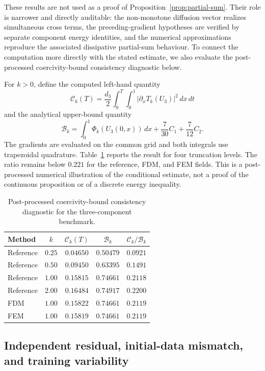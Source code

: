 These results are not used as a proof of Proposition~\ref{prop:partial-sum}. Their role is narrower and directly auditable: the non-monotone diffusion vector realizes simultaneous cross terms, the preceding-gradient hypotheses are verified by separate component energy identities, and the numerical approximations reproduce the associated dissipative partial-sum behaviour. To connect the computation more directly with the stated estimate, we also evaluate the post-processed coercivity-bound consistency diagnostic below.

For $k>0$, define the computed left-hand quantity
\[
 \mathcal C_k(T)=\frac{d_3}{2}\int_0^T\!\!\int_0^1 |\partial_xT_k(U_3)|^2\,dx\,dt
\]
and the analytical upper-bound quantity
\[
 \mathcal B_k=\int_0^1\Phi_k(U_3(0,x))\,dx+\frac7{30}C_1+\frac7{12}C_2.
\]
The gradients are evaluated on the common grid and both integrals use trapezoidal quadrature. Table~\ref{tab:coercivity-diagnostic} reports the result for four truncation levels. The ratio remains below $0.221$ for the reference, FDM, and FEM fields. This is a post-processed numerical illustration of the conditional estimate, not a proof of the continuous proposition or of a discrete energy inequality.

\begin{table}[!htbp]
\centering
\caption{Post-processed coercivity-bound consistency diagnostic for the three-component benchmark.}
\label{tab:coercivity-diagnostic}
\begin{tabular}{lcccc}
\toprule
Method & $k$ & $\mathcal C_k(T)$ & $\mathcal B_k$ & $\mathcal C_k/\mathcal B_k$\\
\midrule
Reference & $0.25$ & $0.04650$ & $0.50479$ & $0.0921$\\
Reference & $0.50$ & $0.09450$ & $0.63395$ & $0.1491$\\
Reference & $1.00$ & $0.15815$ & $0.74661$ & $0.2118$\\
Reference & $2.00$ & $0.16484$ & $0.74917$ & $0.2200$\\
FDM & $1.00$ & $0.15822$ & $0.74661$ & $0.2119$\\
FEM & $1.00$ & $0.15819$ & $0.74661$ & $0.2119$\\
\bottomrule
\end{tabular}
\end{table}


\subsection{Independent residual, initial-data mismatch, and training variability}

